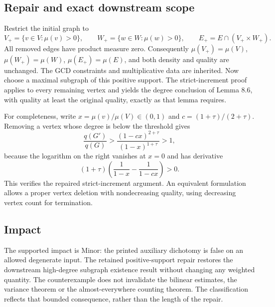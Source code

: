 \documentclass[10pt]{article}
\begin{document}
\subsection*{Repair and exact downstream scope}
Restrict the initial graph to \[V_+=\{v\in V:\mu(v)>0\},\qquad
 W_+=\{w\in W:\mu(w)>0\},\qquad
 E_+=E\cap(V_+\times W_+).\] All removed edges have product measure zero. Consequently \(\mu(V_+)=\mu(V)\), \(\mu(W_+)=\mu(W)\), \(\mu(E_+)=\mu(E)\), and both density and quality are unchanged. The GCD constraints and multiplicative data are inherited. Now choose a maximal subgraph of this positive support. The strict-increment proof applies to every remaining vertex and yields the degree conclusion of Lemma 8.6, with quality at least the original quality, exactly as that lemma requires.\par
For completeness, write \(x=\mu(v)/\mu(V)\in(0,1)\) and \(c=(1+\tau)/(2+\tau)\). Removing a vertex whose degree is below the threshold gives \[\frac{q(G')}{q(G)}>
 \frac{(1-cx)^{2+\tau}}{(1-x)^{1+\tau}}>1,\] because the logarithm on the right vanishes at \(x=0\) and has derivative \[(1+\tau)\left(\frac1{1-x}-\frac1{1-cx}\right)>0.\] This verifies the repaired strict-increment argument. An equivalent formulation allows a proper vertex deletion with nondecreasing quality, using decreasing vertex count for termination.\par
\subsection*{Impact}
The supported impact is Minor: the printed auxiliary dichotomy is false on an allowed degenerate input. The retained positive-support repair restores the downstream high-degree subgraph existence result without changing any weighted quantity. The counterexample does not invalidate the bilinear estimates, the variance theorem or the almost-everywhere counting theorem. The classification reflects that bounded consequence, rather than the length of the repair.\par
\end{document}

